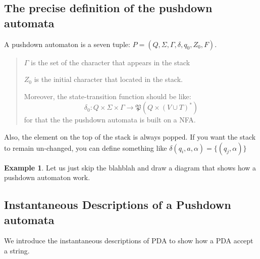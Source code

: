 \documentclass[12pt]{article}
\theoremstyle{definition}
\newtheorem{exam}[definition]{Example}
\theoremstyle{remark}
\newcommand{\ip}[2]{(#1,#2)}
\begin{document}
\subsection{The precise definition of the pushdown automata}
A pushdown automaton is a seven tuple: \(P = (Q , \Sigma , \Gamma ,\delta , q_{0}, Z _{0} , F)\).
\begin{quotation}
	\( \Gamma\) is the set of the character that appears in the stack

	\smallskip
	\( Z _{0}\) is the initial character that located in the stack.

	\smallskip
	Moreover, the state-transition function should be like:
	\[
		\delta _{0} \colon Q \times \Sigma \times \Gamma \to \mathfrak P (Q \times (V\cup T)^{*})
	\]
	for that the the pushdown automata is built on a NFA.
\end{quotation}
Also, the element on the top of the stack is always popped. If you want the stack to remain un-changed, you can define something like \(\delta (q_{i}, a,\alpha) = \{ \ip {q_{j}}\alpha \}\)


\begin{exam}
Let us just skip the blahblah and draw a diagram that shows how a pushdown automaton work.
\begin{figure}
	\centering
{}
\end{figure}
\end{exam}

\subsection{Instantaneous Descriptions of a Pushdown automata}
We introduce the instantaneous descriptions of PDA to show how
a PDA accept a string.
\end{document}
